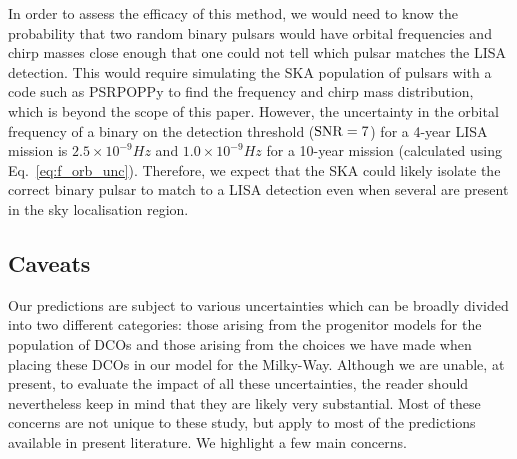 In order to assess the efficacy of this method, we would need to know the probability that two random binary pulsars would have orbital frequencies and chirp masses close enough that one could not tell which pulsar matches the LISA detection. This would require simulating the SKA population of pulsars with a code such as PSRPOPPy \citep{Bates+2014} to find the frequency and chirp mass distribution, which is beyond the scope of this paper. However, the uncertainty in the orbital frequency of a binary on the detection threshold (${\rm SNR} = 7$) for a 4-year LISA mission is $2.5 \times 10^{-9} \unit{Hz}$ and $1.0 \times 10^{-9} \unit{Hz}$ for a 10-year mission (calculated using Eq.~\ref{eq:f_orb_unc}). Therefore, we expect that the SKA could likely isolate the correct binary pulsar to match to a LISA detection even when several are present in the sky localisation region.

\subsection{Caveats}\label{sec:caveats}

Our predictions are subject to various uncertainties which can be broadly divided into two different categories: those arising from the progenitor models for the population of DCOs and those arising from the choices we have made when placing these DCOs in our model for the Milky-Way. Although we are unable, at present, to evaluate the impact of all these uncertainties, the reader should nevertheless keep in mind that they are likely very substantial. Most of these concerns are not unique to these study, but apply to most of the predictions available in present literature. We highlight a few main concerns. 

